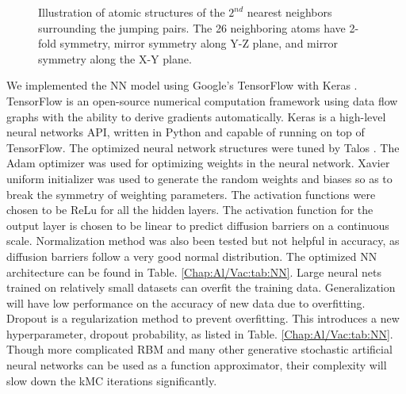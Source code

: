 \begingroup
\begin{figure}[!ht]
  \centering
\caption[Illustration of atomic structures of the $\text{2}^{nd}$ nearest neighbors surrounding the jumping pairs.]{Illustration of atomic structures of the $\text{2}^{nd}$ nearest neighbors surrounding the jumping pairs. The 26 neighboring atoms have 2-fold symmetry, mirror symmetry along Y-Z plane, and mirror symmetry along the X-Y plane.}
\label{Chap:Al/Vac:fig:2nn}
\end{figure}
\endgroup


We implemented the \ac{NN} model using Google's TensorFlow \cite{abadi2016tensorflow} with Keras \cite{chollet2015keras}. TensorFlow is an open-source numerical computation framework using data flow graphs with the ability to derive gradients automatically. Keras is a high-level neural networks API, written in Python and capable of running on top of TensorFlow. The optimized neural network structures were tuned by Talos \cite{Autonomio2019Talos}. The Adam optimizer \cite{kingma2014adam} was used for optimizing weights in the neural network. Xavier uniform initializer \cite{glorot2010understanding} was used to generate the random weights and biases so as to break the symmetry of weighting parameters. The activation functions were chosen to be \acf{ReLu} for all the hidden layers. The activation function for the output layer is chosen to be linear to predict diffusion barriers on a continuous scale. Normalization method was also been tested but not helpful in accuracy, as diffusion barriers follow a very good normal distribution.  The optimized \ac{NN} architecture can be found in Table. \ref{Chap:Al/Vac:tab:NN}. Large neural nets trained on relatively small datasets can overfit the training data. Generalization will have low performance on the accuracy of new data due to overfitting. Dropout is a regularization method to prevent overfitting. This introduces a new hyperparameter, dropout probability, as listed in Table. \ref{Chap:Al/Vac:tab:NN}. Though more complicated \acf{RBM} and many other generative stochastic artificial neural networks can be used as a function approximator, their complexity will slow down the \ac{kMC} iterations significantly.


